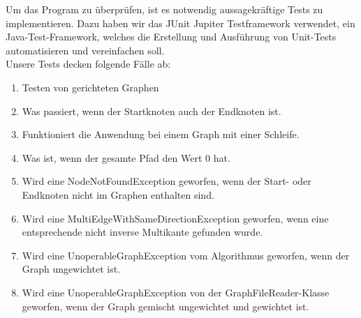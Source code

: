 \documentclass[a4paper]{article}
\begin{document}
Um das Program zu überprüfen, ist es notwendig aussagekräftige Tests zu implementieren. Dazu haben wir das JUnit Jupiter Testframework verwendet, ein Java-Test-Framework, welches die Erstellung und Ausführung von Unit-Tests automatisieren und vereinfachen soll.\\

Unsere Tests decken folgende Fälle ab:

\begin{enumerate}
    \item Testen von gerichteten Graphen
    \item Was passiert, wenn der Startknoten auch der Endknoten ist.
    \item Funktioniert die Anwendung bei einem Graph mit einer Schleife.
    \item Was ist, wenn der gesamte Pfad den Wert 0 hat.
    \item Wird eine NodeNotFoundException geworfen, wenn der Start- oder Endknoten nicht im Graphen enthalten sind.
    \item Wird eine MultiEdgeWithSameDirectionException geworfen, wenn eine entsprechende nicht inverse Multikante gefunden wurde.
    \item Wird eine UnoperableGraphException vom Algorithmus geworfen, wenn der Graph ungewichtet ist.
    \item Wird eine UnoperableGraphException von der GraphFileReader-Klasse geworfen, wenn der Graph gemischt ungewichtet und gewichtet ist.
\end{enumerate}
\end{document}
